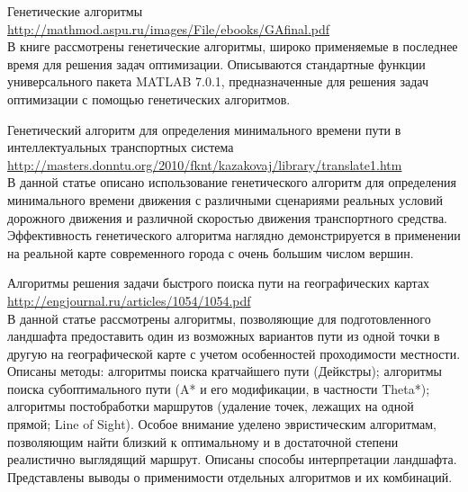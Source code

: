 Генетические алгоритмы \url{http://mathmod.aspu.ru/images/File/ebooks/GAfinal.pdf}\\
В книге рассмотрены генетические алгоритмы, широко применяемые в последнее время для решения задач 
оптимизации. Описываются стандартные функции универсального пакета MATLAB 7.0.1, предназначенные 
для решения задач оптимизации с помощью генетических алгоритмов.

Генетический алгоритм для определения минимального времени пути в интеллектуальных транспортных 
система \url{http://masters.donntu.org/2010/fknt/kazakovaj/library/translate1.htm}\\
В данной статье описано использование генетического алгоритм для определения 
минимального времени движения с различными сценариями реальных условий дорожного движения и 
различной скоростью движения транспортного средства. Эффективность генетического алгоритма 
наглядно демонстрируется в применении на реальной карте современного города с очень большим 
числом вершин.

Алгоритмы решения задачи быстрого поиска пути на географических картах 
\url{http://engjournal.ru/articles/1054/1054.pdf}\\
В данной статье рассмотрены алгоритмы, позволяющие для подготовленного ландшафта предоставить 
один из возможных вариантов пути из одной точки в другую на географической карте с учетом 
особенностей проходимости местности. Описаны методы: алгоритмы поиска кратчайшего пути 
(Дейкстры); алгоритмы поиска субоптимального пути (A* и его модификации, в частности Theta*); 
алгоритмы постобработки маршрутов (удаление точек, лежащих на одной прямой; Line of Sight). 
Особое внимание уделено эвристическим алгоритмам, позволяющим найти близкий к оптимальному и в 
достаточной степени реалистично выглядящий маршрут. Описаны способы интерпретации ландшафта. 
Представлены выводы о применимости отдельных алгоритмов и их комбинаций.

\newpage

